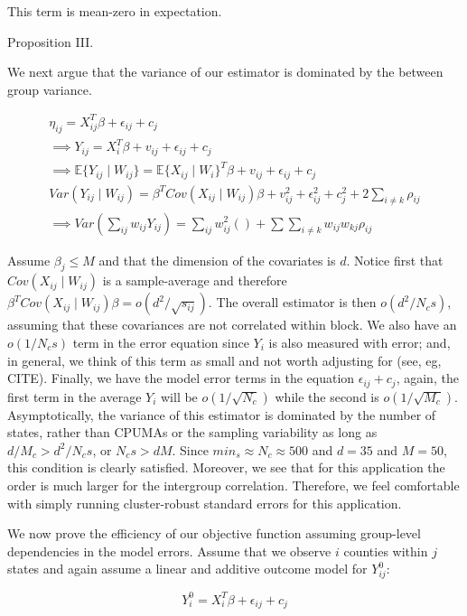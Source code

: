 \documentclass[12pt]{article}
\begin{document}
This term is mean-zero in expectation.

Proposition III.

We next argue that the variance of our estimator is dominated by the between group variance.

\begin{align*}
    \eta_{ij} = X_{ij}^T\beta + \epsilon_{ij} + c_j \\
    \implies Y_{ij} = X_i^T\beta + v_{ij} + \epsilon_{ij} + c_j \\
    \implies \mathbb{E}\{Y_{ij} \mid W_{ij}\} = \mathbb{E}\{X_{ij} \mid W_i\}^T\beta + v_{ij} + \epsilon_{ij} + c_j \\
    Var(Y_{ij} \mid W_{ij}) = \beta^TCov(X_{ij} \mid W_{ij})\beta + v_{ij}^2 + \epsilon_{ij}^2 + c_j^2 + 2\sum_{i\ne k}\rho_{ij} \\
    \implies Var(\sum_{ij}w_{ij}Y_{ij}) = \sum_{ij}w_{ij}^2() + \sum\sum_{i\ne k}w_{ij}w_{kj}\rho_{ij}
\end{align*}

Assume $\beta_j \le M$ and that the dimension of the covariates is $d$. Notice first that $Cov(X_{ij} \mid W_{ij})$ is a sample-average and therefore $\beta^TCov(X_{ij} \mid W_{ij})\beta = o(d^2/\sqrt{s_{ij}})$. The overall estimator is then $o(d^2/N_cs)$, assuming that these covariances are not correlated within block. We also have an $o(1/N_cs)$ term in the error equation since $Y_i$ is also measured with error; and, in general, we think of this term as small and not worth adjusting for (see, eg, CITE). Finally, we have the model error terms in the equation $\epsilon_{ij} + c_j$, again, the first term in the average $Y_i$ will be $o(1/\sqrt{N_c})$ while the second is $o(1/\sqrt{M_c})$. Asymptotically, the variance of this estimator is dominated by the number of states, rather than CPUMAs or the sampling variability as long as $d/M_c > d^2/N_cs$, or $N_cs > dM$. Since $min_{s} \approx N_c \approx 500$ and $d = 35$ and $M = 50$, this condition is clearly satisfied. Moreover, we see that for this application the order is much larger for the intergroup correlation. Therefore, we feel comfortable with simply running cluster-robust standard errors for this application.


We now prove the efficiency of our objective function assuming group-level dependencies in the model errors. Assume that we observe $i$ counties within $j$ states and again assume a linear and additive outcome model for $Y_{ij}^0$:

$$
Y_i^0 = X_i^T\beta + \epsilon_{ij} + c_j
$$
\end{document}
